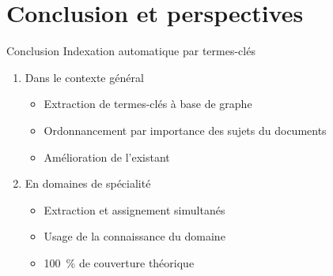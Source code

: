 \section{Conclusion et perspectives}
%
%

  \begin{frame}{Conclusion}
    Indexation automatique par termes-clés
    \begin{enumerate}
      \item{Dans le contexte général}
      \begin{itemize}
        \item{Extraction de termes-clés à base de graphe}
        \item{Ordonnancement par importance des sujets du documents}
        \item{Amélioration de l'existant}
      \end{itemize}
      \item{En domaines de spécialité}
      \begin{itemize}
        \item{Extraction et assignement simultanés}
        \item{Usage de la connaissance du domaine}
        \item{100~\% de couverture théorique}
      \end{itemize}
    \end{enumerate}
  \end{frame}

